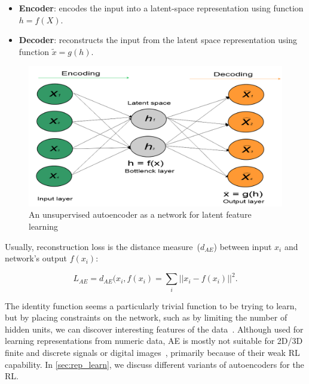 \vspace{-2mm}
\begin{itemize}[noitemsep]
    \item \textbf{Encoder}: encodes the input into a latent-space representation using function $h = f(X)$.
    \item \textbf{Decoder}: reconstructs the input from the latent space representation using function $\tilde{x} = g(h)$. 
\end{itemize}
\vspace{-2mm}

\begin{figure}[h]
    \centering
    \includegraphics[scale=0.6]{images/ae.png}
    \caption{An unsupervised autoencoder as a network for latent feature learning~\cite{karimDLTF2018}}
    \label{fig:ae_theory1}
    \vspace{-2mm}
\end{figure}

Usually, reconstruction loss is the distance measure~($d_{AE}$) between input $x_i$ and network's output $f(x_i)$: 

\vspace{-2mm}
\begin{equation}
    L_{AE}=\text{$d_{AE}$}(x_i, f(x_i) = \sum_{i} ||x_{i}-f(x_i)||^{2}.
    \label{eq:Loss1}
\end{equation}

\hspace*{3.5mm} The identity function seems a particularly trivial function to be trying to learn, but by placing constraints on the network, such as by limiting the number of hidden units, we can discover interesting features of the data~\cite{karimDLTF2018}. Although used for learning representations from numeric data, AE is mostly not suitable for 2D/3D finite and discrete signals or digital images~\cite{min2018survey}, primarily because of their weak RL capability. In \cref{sec:rep_learn}, we discuss different variants of autoencoders for the RL. %

